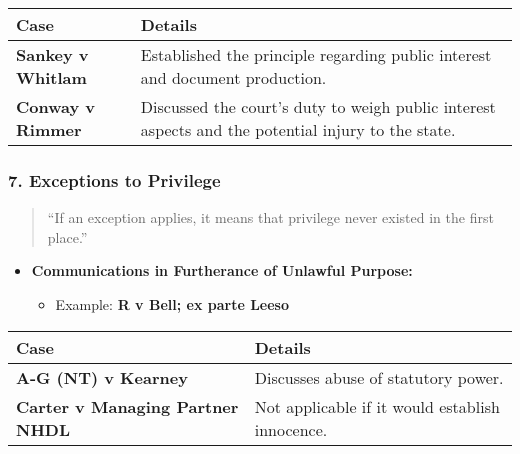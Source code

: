 \begin{longtable}[]{@{}
  >{\raggedright\arraybackslash}p{}
  >{\raggedright\arraybackslash}p{}@{}}
\toprule\noalign{}
\begin{minipage}[b]{\linewidth}\raggedright
\textbf{Case}
\end{minipage} & \begin{minipage}[b]{\linewidth}\raggedright
\textbf{Details}
\end{minipage} \\
\midrule\noalign{}
\endhead
\bottomrule\noalign{}
\endlastfoot
\textbf{Sankey v Whitlam} & Established the principle regarding public
interest and document production. \\
\textbf{Conway v Rimmer} & Discussed the court's duty to weigh public
interest aspects and the potential injury to the state. \\
\end{longtable}

\subsubsection{\texorpdfstring{7. \textbf{Exceptions to
Privilege}}{7. Exceptions to Privilege}}\label{exceptions-to-privilege}

\begin{quote}
``If an exception applies, it means that privilege never existed in the
first place.''
\end{quote}

\begin{itemize}
\tightlist
\item
  \textbf{Communications in Furtherance of Unlawful Purpose:}

  \begin{itemize}
  \tightlist
  \item
    Example: \textbf{R v Bell; ex parte Leeso}
  \end{itemize}
\end{itemize}

\begin{longtable}[]{@{}
  >{\raggedright\arraybackslash}p{}
  >{\raggedright\arraybackslash}p{}@{}}
\toprule\noalign{}
\begin{minipage}[b]{\linewidth}\raggedright
\textbf{Case}
\end{minipage} & \begin{minipage}[b]{\linewidth}\raggedright
\textbf{Details}
\end{minipage} \\
\midrule\noalign{}
\endhead
\bottomrule\noalign{}
\endlastfoot
\textbf{A-G (NT) v Kearney} & Discusses abuse of statutory power. \\
\textbf{Carter v Managing Partner NHDL} & Not applicable if it would
establish innocence. \\
\end{longtable}

